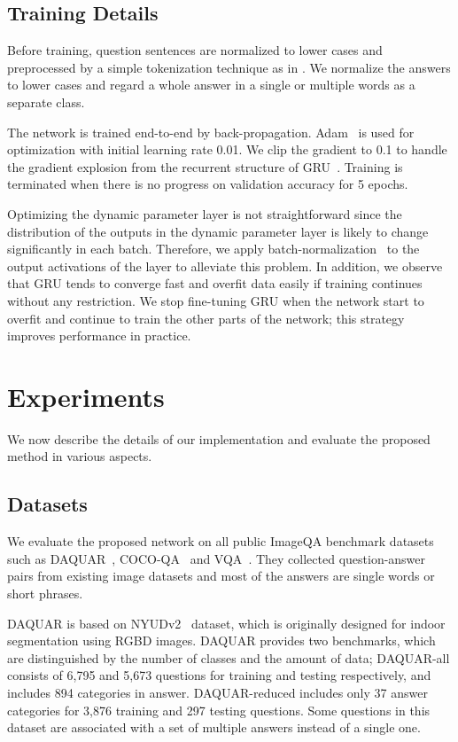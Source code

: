 \documentclass[10pt,twocolumn,letterpaper]{article}
\begin{document}
\subsection{Training Details}




Before training, question sentences are normalized to lower cases and preprocessed by a simple tokenization technique as in \cite{Showattend}.
We normalize the answers to lower cases and regard a whole answer in a single or multiple words as a separate class.


The network is trained end-to-end by back-propagation.
Adam~\cite{Adam} is used for optimization with initial learning rate 0.01.
We clip the gradient to 0.1 to handle the gradient explosion from the recurrent structure of GRU~\cite{pascanu2013difficulty}.
Training is terminated when there is no progress on validation accuracy for 5 epochs.

Optimizing the dynamic parameter layer is not straightforward since the distribution of the outputs in the dynamic parameter layer is likely to change significantly in each batch.
Therefore, we apply batch-normalization~\cite{Batchnorm} to the output activations of the layer to alleviate this problem.
In addition, we observe that GRU tends to converge fast and overfit data easily if training continues without any restriction.
We stop fine-tuning GRU when the network start to overfit and continue to train the other parts of the network; this strategy improves performance in practice.




\section{Experiments}
\label{sec:experiment}
We now describe the details of our implementation and evaluate the proposed method in various aspects.

\subsection{Datasets}
We evaluate the proposed network on all public ImageQA benchmark datasets such as DAQUAR~\cite{Multiworld}, COCO-QA~\cite{mren2015} and VQA~\cite{VQA}. 
They collected question-answer pairs from existing image datasets and most of the answers are single words or short phrases.

DAQUAR is based on NYUDv2~\cite{Nyud} dataset, which is originally designed for indoor segmentation using RGBD images.
DAQUAR provides two benchmarks, which are distinguished by the number of classes and the amount of data; DAQUAR-all consists of 6,795 and 5,673 questions for training and testing respectively, and includes 894 categories in answer.
DAQUAR-reduced includes only 37 answer categories for 3,876 training and 297 testing questions.
Some questions in this dataset are associated with a set of multiple answers instead of a single one.
\end{document}
